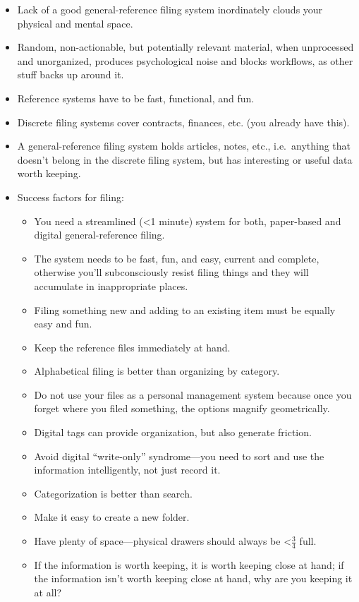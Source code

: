 \documentclass{article}
\begin{document}
\begin{itemize}
  \item Lack of a good general-reference filing system inordinately clouds your physical and mental space.
  \item Random, non-actionable, but potentially relevant material, when unprocessed and unorganized, produces psychological noise and blocks workflows, as other stuff backs up around it.
  \item Reference systems have to be fast, functional, and fun.
  \item Discrete filing systems cover contracts, finances, etc. (you already have this).
  \item A general-reference filing system holds articles, notes, etc., i.e.\ anything that doesn't belong in the discrete filing system, but has interesting or useful data worth keeping.
  \item Success factors for filing:
  \begin{itemize}
    \item You need a streamlined (\textless 1 minute) system for both, paper-based and digital general-reference filing.
    \item The system needs to be fast, fun, and easy, current and complete, otherwise you'll subconsciously resist filing things and they will accumulate in inappropriate places.
    \item Filing something new and adding to an existing item must be equally easy and fun.
    \item Keep the reference files immediately at hand.
    \item Alphabetical filing is better than organizing by category.
    \item Do not use your files as a personal management system because once you forget where you filed something, the options magnify geometrically.
    \item Digital tags can provide organization, but also generate friction.
    \item Avoid digital ``write-only'' syndrome---you need to sort and use the information intelligently, not just record it.
    \item Categorization is better than search.
    \item Make it easy to create a new folder.
    \item Have plenty of space---physical drawers should always be \textless \( \frac{3}{4} \) full.
    \item If the information is worth keeping, it is worth keeping close at hand; if the information isn't worth keeping close at hand, why are you keeping it at all?

\end{itemize}
\end{itemize}
\end{document}

